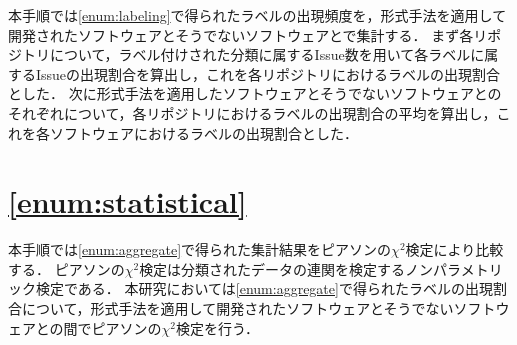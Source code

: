 \documentclass[main]{subfiles}
\begin{document}
本手順では\ref{enum:labeling}で得られたラベルの出現頻度を，形式手法を適用して開発されたソフトウェアとそうでないソフトウェアとで集計する．
まず各リポジトリについて，ラベル付けされた分類に属するIssue数を用いて各ラベルに属するIssueの出現割合を算出し，これを各リポジトリにおけるラベルの出現割合とした．
次に形式手法を適用したソフトウェアとそうでないソフトウェアとのそれぞれについて，各リポジトリにおけるラベルの出現割合の平均を算出し，これを各ソフトウェアにおけるラベルの出現割合とした．

\section{\ref{enum:statistical}}

本手順では\ref{enum:aggregate}で得られた集計結果をピアソンの\(\chi^2\)検定により比較する．
ピアソンの\(\chi^2\)検定は分類されたデータの連関を検定するノンパラメトリック検定である．
本研究においては\ref{enum:aggregate}で得られたラベルの出現割合について，形式手法を適用して開発されたソフトウェアとそうでないソフトウェアとの間でピアソンの\(\chi^2\)検定を行う．
\end{document}
